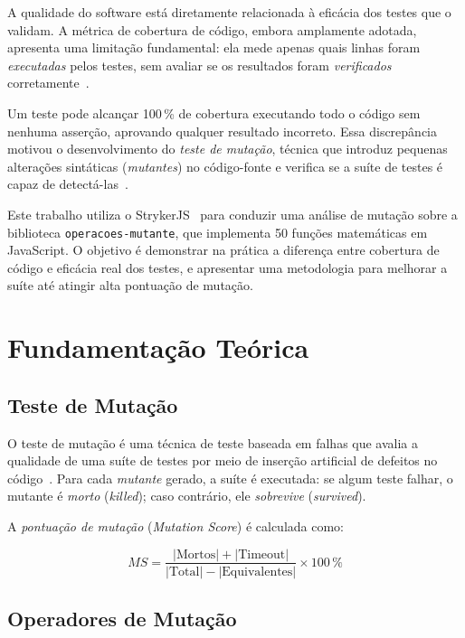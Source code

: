 \documentclass[conference]{IEEEtran}
\begin{document}
A qualidade do software está diretamente relacionada à eficácia dos testes que o
validam. A métrica de cobertura de código, embora amplamente adotada, apresenta
uma limitação fundamental: ela mede apenas quais linhas foram \emph{executadas}
pelos testes, sem avaliar se os resultados foram \emph{verificados}
corretamente~\cite{jia2011analysis}.

Um teste pode alcançar 100\,\% de cobertura executando todo o código sem nenhuma
asserção, aprovando qualquer resultado incorreto. Essa discrepância motivou o
desenvolvimento do \textit{teste de mutação}, técnica que introduz pequenas
alterações sintáticas (\textit{mutantes}) no código-fonte e verifica se a suíte
de testes é capaz de detectá-las~\cite{offutt2001mutation}.

Este trabalho utiliza o StrykerJS~\cite{stryker} para conduzir uma análise de
mutação sobre a biblioteca \texttt{operacoes-mutante}, que implementa 50 funções
matemáticas em JavaScript. O objetivo é demonstrar na prática a diferença entre
cobertura de código e eficácia real dos testes, e apresentar uma metodologia para
melhorar a suíte até atingir alta pontuação de mutação.

\section{Fundamentação Teórica}

\subsection{Teste de Mutação}

O teste de mutação é uma técnica de teste baseada em falhas que avalia a qualidade
de uma suíte de testes por meio de inserção artificial de defeitos no
código~\cite{jia2011analysis}. Para cada \textit{mutante} gerado, a suíte é
executada: se algum teste falhar, o mutante é \textit{morto} (\textit{killed});
caso contrário, ele \textit{sobrevive} (\textit{survived}).

A \textit{pontuação de mutação} (\textit{Mutation Score}) é calculada como:

\begin{equation}
  MS = \frac{|\text{Mortos}| + |\text{Timeout}|}{|\text{Total}| - |\text{Equivalentes}|}
  \times 100\,\%
  \label{eq:ms}
\end{equation}

\subsection{Operadores de Mutação}
\end{document}
